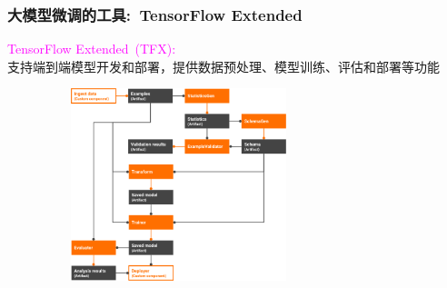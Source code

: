 %
%
%
%
%
%
%
%    
\begin{frame}
	\frametitle{大模型微调的工具:~\textrm{TensorFlow Extended}}
	\textcolor{magenta}{\textrm{TensorFlow Extended~(TFX):}}\\支持端到端模型开发和部署，提供数据预处理、模型训练、评估和部署等功能
\begin{figure}[h!]
\vspace*{-0.10in}
\centering
\includegraphics[height=2.2in, width=3.1in, viewport=0 0 600 530,clip]{Figures/TXF_Pipeline.png}
\label{TXF_Pipeline}
\end{figure}
\end{frame}

